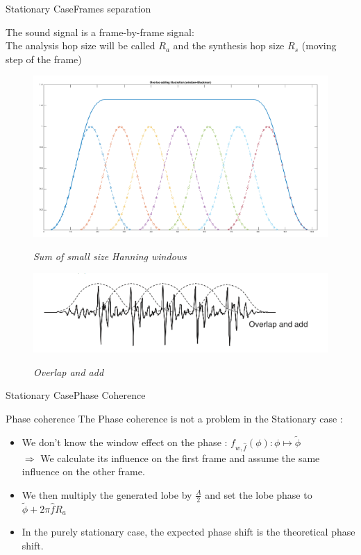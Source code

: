 \documentclass{bredelebeamer}
\begin{document}
\begin{frame}{Stationary Case}{Frames separation}

The sound signal is  a frame-by-frame signal: \\
The analysis hop size will be called $R_a$ and the synthesis hop size $R_s$ (moving step of the frame)
\begin{figure}

	{\includegraphics[scale=0.25]{overlap2.png}}
	\caption{\it Sum of small size Hanning windows}
\end{figure}
\begin{figure}
	{\includegraphics[scale=0.25]{overlap1.png}}
	\caption{\it Overlap and add}
\end{figure}
\end{frame}
\begin{frame}{Stationary Case}{Phase Coherence}

\begin{block}{Phase coherence}
The Phase coherence is not a problem in the Stationary case :
\begin{itemize}
\item We don't know the window effect on the phase : ${f_{w, \hat{f}}(\phi) : \phi \mapsto \tilde{\phi}}$  \\
$ \Rightarrow$ We calculate its influence on the first frame and assume the same influence on the other frame.

\item We then multiply the generated lobe by $\frac{A}{2}$ and set the lobe phase to $\tilde{\phi} + 2\pi \hat{f} R_a$   
\item In the purely stationary case, the expected phase shift is the theoretical phase shift.
\end{itemize}
\end{block}

\end{frame}
\end{document}
